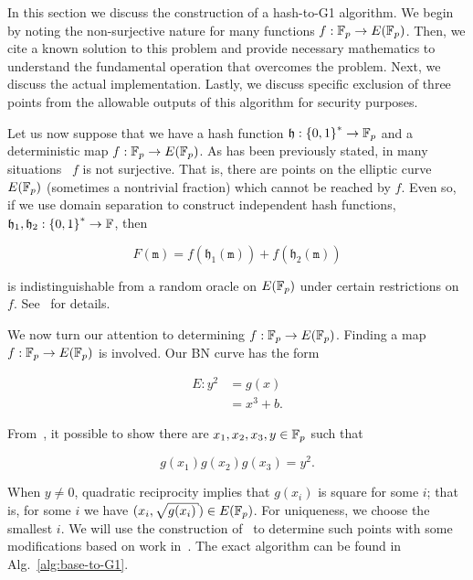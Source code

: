 In this section we discuss the construction of a hash-to-G1 algorithm.
We begin by noting the non-surjective nature for many functions
$f:\mathbb{F}_{p}\to E(\mathbb{F}_{p})$.
Then, we cite a known solution to this problem and provide necessary
mathematics to understand the fundamental operation that
overcomes the problem.
Next, we discuss the actual implementation.
Lastly, we discuss specific exclusion of three points from the allowable
outputs of this algorithm for security purposes.

Let us now suppose that we have a hash function
$\mathfrak{h}:\left\{ 0,1 \right\}^{*}\to\mathbb{F}_{p}$ and a
deterministic map $f:\mathbb{F}_{p}\to E(\mathbb{F}_{p})$.
As has been previously stated, in many
situations~\cite{icart2009hash,ft2012bnhashtocurve,boneh2019h2cBLS12}
$f$ is not surjective.
That is, there are points on the elliptic curve $E(\mathbb{F}_{p})$
(sometimes a nontrivial fraction) which cannot be reached by $f$.
Even so, if we use domain separation to construct independent hash functions,
$\mathfrak{h}_{1}, \mathfrak{h}_{2}:\left\{ 0,1 \right\}^{*}\to\mathbb{F}$,
then

\begin{equation}
    F(\texttt{m}) = f(\mathfrak{h}_{1}(\texttt{m}))
                    + f(\mathfrak{h}_{2}(\texttt{m}))
\end{equation}

\noindent
is indistinguishable from a random oracle on $E(\mathbb{F}_{p})$
under certain restrictions on $f$.
See~\cite{ft2012bnhashtocurve,tibouchi2014elligator} for details.

We now turn our attention to determining $f:\mathbb{F}_{p}\to E(\mathbb{F}_{p})$.
Finding a map $f:\mathbb{F}_{p}\to E(\mathbb{F}_{p})$ is involved.
Our BN curve has the form

\begin{align}
    E:y^{2} &= g(x) \nonumber\\
            &= x^{3} + b.
\end{align}

\noindent
From~\cite{ft2012bnhashtocurve}, it possible to show there
are $x_{1},x_{2},x_{3},y\in\mathbb{F}_{p}$ such that

\begin{equation}
    g(x_{1})g(x_{2})g(x_{3}) = y^{2}.
\end{equation}

\noindent
When $y\ne0$, quadratic reciprocity implies that $g(x_{i})$ is square
for some $i$; that is, for some $i$ we have
$(x_{i},\sqrt{g(x_{i})})\in E(\F_{p})$.
For uniqueness, we choose the smallest $i$.
We will use the construction of~\cite{ft2012bnhashtocurve}
to determine such points with some modifications based
on work in~\cite{boneh2019h2cBLS12}.
The exact algorithm can be found in Alg.~\ref{alg:base-to-G1}.

